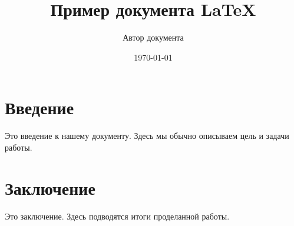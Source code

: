 \documentclass{article}
\title{Пример документа LaTeX}
\author{Автор документа}
\date{\today}
\begin{document}
\maketitle

\section{Введение}
Это введение к нашему документу. Здесь мы обычно описываем цель и задачи работы.

\section{Заключение}
Это заключение. Здесь подводятся итоги проделанной работы.
\end{document}
